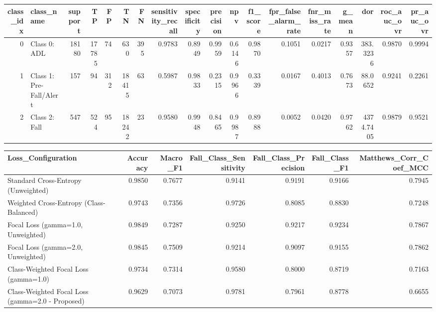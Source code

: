 \begin{tabular}{rlrrrrrrrrrrrrrrrr}
\toprule
class_idx & class_name & support & TP & FP & TN & FN & sensitivity_recall & specificity & precision & npv & f1_score & fpr_false_alarm_rate & fnr_miss_rate & g_mean & dor & roc_auc_ovr & pr_auc_ovr \\
\midrule
0 & Class 0: ADL & 18180 & 17785 & 74 & 630 & 395 & 0.9783 & 0.8949 & 0.9959 & 0.6146 & 0.9870 & 0.1051 & 0.0217 & 0.9357 & 383.3236 & 0.9870 & 0.9994 \\
1 & Class 1: Pre-Fall/Alert & 157 & 94 & 312 & 18415 & 63 & 0.5987 & 0.9833 & 0.2315 & 0.9966 & 0.3339 & 0.0167 & 0.4013 & 0.7673 & 88.0652 & 0.9241 & 0.2261 \\
2 & Class 2: Fall & 547 & 524 & 95 & 18242 & 23 & 0.9580 & 0.9948 & 0.8465 & 0.9987 & 0.8988 & 0.0052 & 0.0420 & 0.9762 & 4374.7405 & 0.9879 & 0.9521 \\
\bottomrule
\end{tabular}


\begin{tabular}{lrrrrrr}
\toprule
Loss_Configuration & Accuracy & Macro_F1 & Fall_Class_Sensitivity & Fall_Class_Precision & Fall_Class_F1 & Matthews_Corr_Coef_MCC \\
\midrule
Standard Cross-Entropy (Unweighted) & 0.9850 & 0.7677 & 0.9141 & 0.9191 & 0.9166 & 0.7945 \\
Weighted Cross-Entropy (Class-Balanced) & 0.9743 & 0.7356 & 0.9726 & 0.8085 & 0.8830 & 0.7248 \\
Focal Loss (gamma=1.0, Unweighted) & 0.9849 & 0.7287 & 0.9250 & 0.9217 & 0.9234 & 0.7867 \\
Focal Loss (gamma=2.0, Unweighted) & 0.9845 & 0.7509 & 0.9214 & 0.9097 & 0.9155 & 0.7862 \\
Class-Weighted Focal Loss (gamma=1.0) & 0.9734 & 0.7314 & 0.9580 & 0.8000 & 0.8719 & 0.7163 \\
Class-Weighted Focal Loss (gamma=2.0 - Proposed) & 0.9629 & 0.7073 & 0.9781 & 0.7961 & 0.8778 & 0.6655 \\
\bottomrule
\end{tabular}

